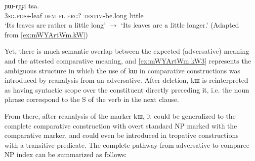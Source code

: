 \documentclass[oldfontcommands,oneside,a4paper,11pt]{article}
\newcommand{\ipa}[1]{{\phon #1}} %
\begin{document}
                      \begin{exe}
  \ex  \label{ex:mWYArtWm.kW3}  
  \gll      
[\ipa{ɯ-jwaʁ} 	\ipa{nɯ}   \ipa{ra}] 	\ipa{kɯ} 	\ipa{ɲɯ-rɲɟi} 	\ipa{tsa.} \\
\textsc{3sg.poss}-leaf \textsc{dem} \textsc{pl}   \textsc{erg?} \textsc{testim}-be.long little \\
\glt *`Its leaves are rather a little long'  $\rightarrow$  `Its leaves are a little longer.'
(Adapted from \ref{ex:mWYArtWm.kW})
          \end{exe} 
  
  
  Yet, there is much semantic overlap   between the expected (adversative) meaning and the attested comparative meaning, and \ref{ex:mWYArtWm.kW3}   represents the ambiguous structure in which the use of \ipa{kɯ} in comparative constructions was introduced by reanalysis from an adversative. After deletion, \ipa{kɯ} is reinterpreted as having syntactic scope over the constituent directly preceding it, i.e. the noun phrase correspond to the S of the verb in the next clause.
  
  From there, after reanalysis of the marker \ipa{kɯ}, it could be generalized to the complete comparative construction with overt standard NP marked with the comparative marker, and could even be introduced in tropative constructions with a transitive predicate. The complete pathway from adversative to comparee NP index can be summarized as follows:
  
\end{document}
